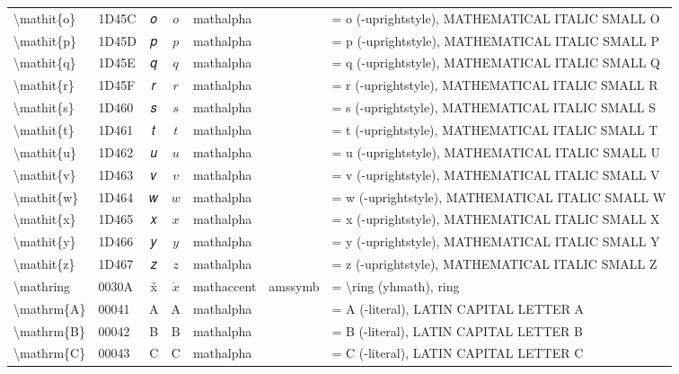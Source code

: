 \documentclass[a4paper,landscape]{article}
\begin{document}
\begin{longtable}{llcclll}
\textbackslash{}mathit\{o\} & 1D45C & 𝑜 & $\mathit{o}$ & mathalpha &  & = o (-uprightstyle),  MATHEMATICAL ITALIC SMALL O \\
\textbackslash{}mathit\{p\} & 1D45D & 𝑝 & $\mathit{p}$ & mathalpha &  & = p (-uprightstyle),  MATHEMATICAL ITALIC SMALL P \\
\textbackslash{}mathit\{q\} & 1D45E & 𝑞 & $\mathit{q}$ & mathalpha &  & = q (-uprightstyle),  MATHEMATICAL ITALIC SMALL Q \\
\textbackslash{}mathit\{r\} & 1D45F & 𝑟 & $\mathit{r}$ & mathalpha &  & = r (-uprightstyle),  MATHEMATICAL ITALIC SMALL R \\
\textbackslash{}mathit\{s\} & 1D460 & 𝑠 & $\mathit{s}$ & mathalpha &  & = s (-uprightstyle),  MATHEMATICAL ITALIC SMALL S \\
\textbackslash{}mathit\{t\} & 1D461 & 𝑡 & $\mathit{t}$ & mathalpha &  & = t (-uprightstyle),  MATHEMATICAL ITALIC SMALL T \\
\textbackslash{}mathit\{u\} & 1D462 & 𝑢 & $\mathit{u}$ & mathalpha &  & = u (-uprightstyle),  MATHEMATICAL ITALIC SMALL U \\
\textbackslash{}mathit\{v\} & 1D463 & 𝑣 & $\mathit{v}$ & mathalpha &  & = v (-uprightstyle),  MATHEMATICAL ITALIC SMALL V \\
\textbackslash{}mathit\{w\} & 1D464 & 𝑤 & $\mathit{w}$ & mathalpha &  & = w (-uprightstyle),  MATHEMATICAL ITALIC SMALL W \\
\textbackslash{}mathit\{x\} & 1D465 & 𝑥 & $\mathit{x}$ & mathalpha &  & = x (-uprightstyle),  MATHEMATICAL ITALIC SMALL X \\
\textbackslash{}mathit\{y\} & 1D466 & 𝑦 & $\mathit{y}$ & mathalpha &  & = y (-uprightstyle),  MATHEMATICAL ITALIC SMALL Y \\
\textbackslash{}mathit\{z\} & 1D467 & 𝑧 & $\mathit{z}$ & mathalpha &  & = z (-uprightstyle),  MATHEMATICAL ITALIC SMALL Z \\
\textbackslash{}mathring & 0030A & x̊ & $\mathring{x}$ & mathaccent & amssymb & = \textbackslash{}ring (yhmath), ring \\
\textbackslash{}mathrm\{A\} & 00041 & A & $\mathrm{A}$ & mathalpha &  & = A (-literal),  LATIN CAPITAL LETTER A \\
\textbackslash{}mathrm\{B\} & 00042 & B & $\mathrm{B}$ & mathalpha &  & = B (-literal),  LATIN CAPITAL LETTER B \\
\textbackslash{}mathrm\{C\} & 00043 & C & $\mathrm{C}$ & mathalpha &  & = C (-literal),  LATIN CAPITAL LETTER C \\

\end{longtable}
\end{document}

